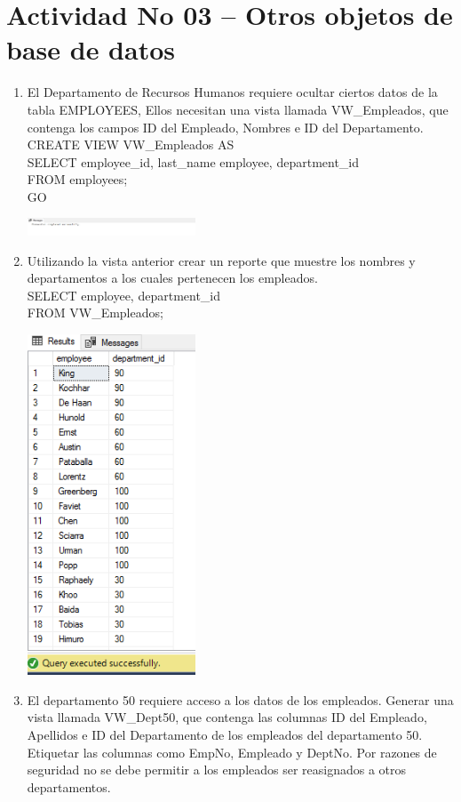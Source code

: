 \section{Actividad No 03 –  Otros objetos de base de datos} 
		
\begin{enumerate}[1.]
	\item El Departamento de Recursos Humanos requiere ocultar ciertos datos de la tabla EMPLOYEES, Ellos necesitan una vista llamada VW\_Empleados, que contenga los campos ID del Empleado, Nombres e ID del Departamento.
	\\CREATE VIEW VW\_Empleados AS
	\\SELECT employee\_id, last\_name employee, department\_id
	\\FROM employees;
	\\GO
	\begin{center}
	\includegraphics[width=5cm]{./Imagenes/actividad_03_01}
	\end{center}
	\item Utilizando la vista anterior crear un reporte que muestre los nombres y departamentos a los cuales
pertenecen los empleados.
	\\SELECT employee, department\_id
	\\FROM VW\_Empleados;
	\begin{center}
	\includegraphics[width=5cm]{./Imagenes/actividad_03_02}
	\end{center}
	\item El departamento 50 requiere acceso a los datos de los empleados. Generar una vista llamada VW\_Dept50, que contenga las columnas ID del Empleado, Apellidos e ID del Departamento de los empleados del departamento 50. Etiquetar las columnas como EmpNo, Empleado y DeptNo. Por razones de seguridad no se debe permitir a los empleados ser reasignados a otros departamentos.

\end{enumerate}
